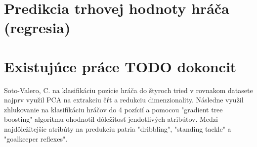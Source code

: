 \documentclass[runningheads]{llncs}
\begin{document}
\section{Predikcia trhovej hodnoty hráča (regresia)}


\section{Existujúce práce TODO dokoncit}
Soto-Valero, C. na klasifikáciu pozície hráča do štyroch tried v rovnakom datasete najprv využil PCA na extrakciu čŕt a redukciu dimenzionality. Následne využil zhlukovanie na klasifikáciu hráčov do 4 pozícií a pomocou "gradient tree boosting" algoritmu ohodnotil dôležitosť jendotlivých atribútov. Medzi najdôležitejšie atribúty na predukciu patria "dribbling", "standing tackle" a "goalkeeper reflexes". \cite{RICYDE1165}



\end{document}

